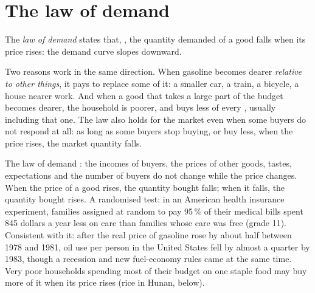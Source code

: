 \section{The law of demand}\label{sec:g10:demand:law}

\begin{definition}\label{def:g10:demand:law}
The \emph{law of demand} states that, , the quantity demanded of a good falls when
its price rises: the demand curve slopes downward.
\end{definition}

Two reasons work in the same direction. When gasoline becomes dearer \emph{relative to other things}, it pays to replace
some of it: a smaller car, a train, a bicycle, a house nearer work. And when a good that takes a large part of the budget
becomes dearer, the household is poorer, and buys less of every , usually including that one. The law also holds for the
market even when some buyers do not respond at all: as long as some buyers stop buying, or buy less, when the price
rises, the market quantity falls.

\begin{model}{The law of demand}
\assumes {}: the incomes of buyers, the prices of other goods, tastes, expectations and the number of
  buyers do not change while the price changes.
\predicts When the price of a good rises, the quantity bought falls; when it falls, the quantity bought rises.
\tested A randomised test: in an American health insurance experiment, families assigned at random to pay 95\,\% of
  their medical bills spent 845 dollars a year less on care than families whose care was free (grade 11). Consistent with it:
  after the real price of gasoline rose by about half between 1978 and 1981, oil use per person in the United States fell
  by almost a quarter by 1983, though a recession and new fuel-economy rules came at the same time.
\breaks Very poor households spending most of their budget on one staple food may buy more of it when its price rises
  (rice in Hunan, below).
\end{model}

